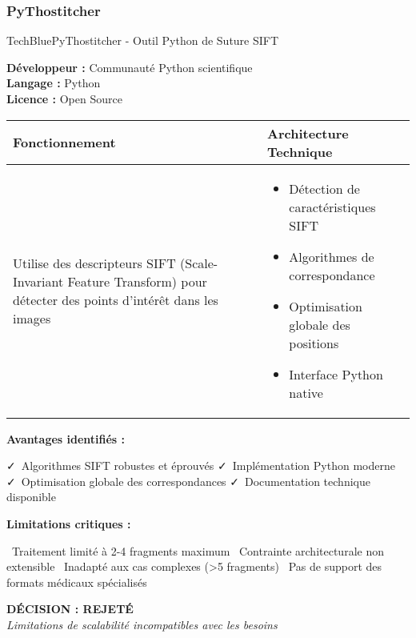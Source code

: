 \documentclass[12pt,a4paper]{report}
\newcommand{\pro}[1]{\textcolor{SuccessGreen}{\faCheck\ #1}}
\newcommand{\con}[1]{\textcolor{DangerRed}{\faTimes\ #1}}
\begin{document}
\begin{}
\begin{}
\begin{}
\subsubsection{PyThostitcher}

\begin{techbox}{TechBlue}{PyThostitcher - Outil Python de Suture SIFT}

\textbf{Développeur :} Communauté Python scientifique \\
\textbf{Langage :} Python \\
\textbf{Licence :} Open Source

\vspace{0.5cm}

\begin{tabularx}{\textwidth}{|X|X|}
\hline
\rowcolor{LightGray}
\textbf{Fonctionnement} & \textbf{Architecture Technique} \\
\hline
Utilise des descripteurs SIFT (Scale-Invariant Feature Transform) pour détecter des points d'intérêt dans les images & 
\begin{itemize}[nosep]
\item Détection de caractéristiques SIFT
\item Algorithmes de correspondance
\item Optimisation globale des positions
\item Interface Python native
\end{itemize} \\
\hline
\end{tabularx}

\vspace{0.5cm}

\textbf{Avantages identifiés :}
\begin{itemize}[leftmargin=*]
    \pro{Algorithmes SIFT robustes et éprouvés}
    \pro{Implémentation Python moderne}
    \pro{Optimisation globale des correspondances}
    \pro{Documentation technique disponible}
\end{itemize}

\textbf{Limitations critiques :}
\begin{itemize}[leftmargin=*]
    \con{Traitement limité à 2-4 fragments maximum}
    \con{Contrainte architecturale non extensible}
    \con{Inadapté aux cas complexes (>5 fragments)}
    \con{Pas de support des formats médicaux spécialisés}
\end{itemize}

\begin{center}
\textbf{\textcolor{DangerRed}{DÉCISION : REJETÉ}}\\
\textit{Limitations de scalabilité incompatibles avec les besoins}
\end{center}


\end{techbox}
\end{}
\end{}
\end{}
\end{document}
